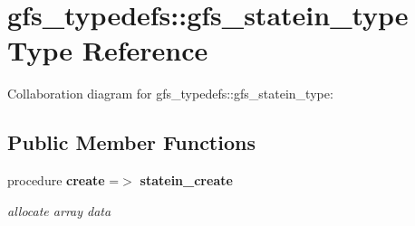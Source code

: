 \section{gfs\+\_\+typedefs\+:\+:gfs\+\_\+statein\+\_\+type Type Reference}
\label{structgfs__typedefs_1_1gfs__statein__type}


Collaboration diagram for gfs\+\_\+typedefs\+:\+:gfs\+\_\+statein\+\_\+type\+:
\subsection*{Public Member Functions}
\begin{DoxyCompactItemize}
\item 
procedure \textbf{ create} =$>$ \textbf{ statein\+\_\+create}
\begin{DoxyCompactList}\small\item\em allocate array data \end{DoxyCompactList}\end{DoxyCompactItemize}
